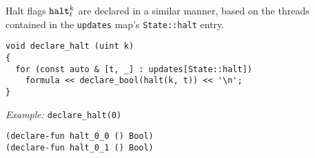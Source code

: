 

\noindent
Halt flags $\texttt{halt}^k_t$ are declared in a similar manner, based on the threads contained in the \texttt{updates} map's \texttt{State::halt} entry.

\newpage
\begin{lstlisting}[style=c++]
void declare_halt (uint k)
{
  for (const auto & [t, _] : updates[State::halt])
    formula << declare_bool(halt(k, t)) << '\n';
}
\end{lstlisting}

\noindent
\emph{Example:} \lstinline[style=c++]{declare_halt(0)}

\begin{lstlisting}[language=smtlib]
(declare-fun halt_0_0 () Bool)
(declare-fun halt_0_1 () Bool)
\end{lstlisting}







